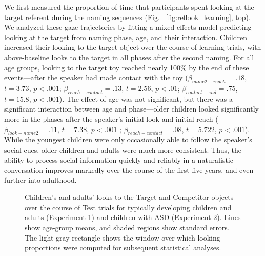 \documentclass{pnastwo}
\begin{document}
\begin{article}
We first measured the proportion of time that participants spent looking at the target referent during the naming sequences (Fig. ~\ref{fig:reflook_learning}, top). We analyzed these gaze trajectories by fitting a mixed-effects model predicting looking at the target from naming phase, age, and their interaction. Children increased their looking to the target object over the course of learning trials, with above-baseline looks to the target in all phases after the second naming. For all age groups, looking to the target toy reached nearly 100\% by the end of these events---after the speaker had made contact with the toy ($\beta_{name2-reach} = .18$, $t = 3.73$, $p < .001$; $\beta_{reach-contact} = .13$, $t = 2.56$, $p < .01$; $\beta_{contact-end} = .75$, $t = 15.8$, $p < .001$). The effect of age was not significant, but there was a significant interaction between age and phase---older children looked significantly more in the phases after the speaker's initial look and initial reach ($\beta_{look-name2} = .11$, $t = 7.38$, $p < .001$ ; $\beta_{reach-contact} = .08$, $t = 5.722$, $p < .001$). While the youngest children were only occasionally able to follow the speaker's social cues, older children and adults were much more consistent. Thus, the ability to process social information quickly and reliably in a naturalistic conversation improves markedly over the course of the first five years, and even further into adulthood.

\begin{figure}[tb]
	\caption{\label{fig:reflook_timecourse}Children's and adults' looks to the Target and Competitor objects over the course of Test trials for typically developing children and adults (Experiment 1) and children with ASD (Experiment 2). Lines show age-group means, and shaded regions show standard errors. The light gray rectangle shows the window over which looking proportions were computed for subsequent statistical analyses.}
\end{figure}


\end{article}
\end{document}
